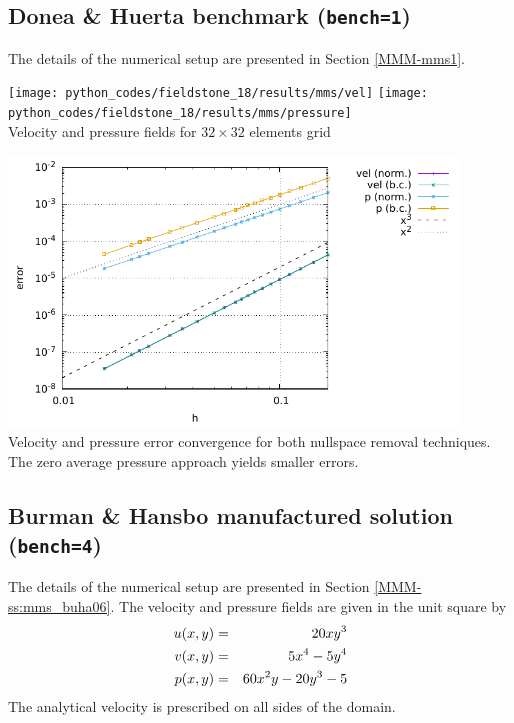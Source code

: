 \subsection*{Donea \& Huerta benchmark ({\tt bench=1})}
The details of the numerical setup are presented in Section \ref{MMM-mms1}.

\begin{center}
\texttt{[image: python\_codes/fieldstone\_18/results/mms/vel]}
\texttt{[image: python\_codes/fieldstone\_18/results/mms/pressure]}\\
{\captionfont Velocity and pressure fields for $32\times 32$ elements grid}
\end{center}

\begin{center}
\includegraphics[width=12cm]{python_codes/fieldstone_18/results/mms/errors}\\
{\captionfont Velocity and pressure error convergence for both nullspace removal 
techniques. The zero average pressure approach yields smaller errors.}
\end{center}

\newpage
\subsection*{Burman \& Hansbo manufactured solution ({\tt bench=4})}

The details of the numerical setup are presented in Section \ref{MMM-ss:mms_buha06}.
The velocity and pressure fields are given in the unit square by
\begin{eqnarray}
u(x,y) &=& 20xy^3 \nonumber\\
v(x,y) &=& 5x^4-5y^4 \nonumber\\
p(x,y) &=& 60x^2y -20y^3 -5
\end{eqnarray}
The analytical velocity is prescribed on all sides of the domain.

